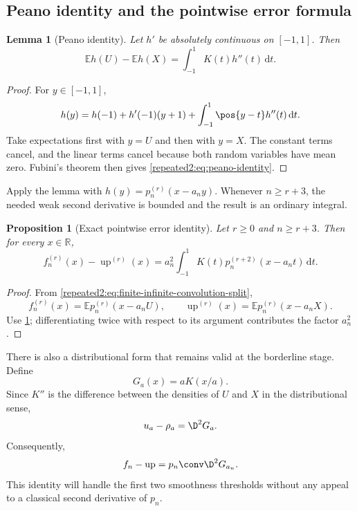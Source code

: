 \documentclass[11pt,oneside]{article}
\newtheorem{proposition}[proposition]{Proposition}
\newtheorem{lemma}[lemma]{Lemma}
\theoremstyle{definition}
\theoremstyle{remark}
\newcommand{\R}{\mathbb R}
\newcommand{\Up}{\operatorname{up}}
\newcommand{\dd}{\,\mathrm d}
\newcommand{\E}{\mathbb E}
\begin{document}
\subsection{Peano identity and the pointwise error formula}

\begin{lemma}[Peano identity]
\label{repeated2:lem:peano-identity}
Let $h'$ be absolutely continuous on $[-1,1]$.  Then
\begin{equation}
 \E h(U)-\E h(X)=\int_{-1}^{1}K(t)h''(t)\dd t.
 \label{repeated2:eq:peano-identity}
\end{equation}
\end{lemma}

\begin{proof}
For $y\in[-1,1]$,
\[
 h(y)=h(-1)+h'(-1)(y+1)+\int_{-1}^{1}\pos{y-t}h''(t)\dd t.
\]
Take expectations first with $y=U$ and then with $y=X$.  The constant terms cancel, and
the linear terms cancel because both random variables have mean zero.  Fubini's theorem
then gives \eqref{repeated2:eq:peano-identity}.
\end{proof}

Apply the lemma with $h(y)=p_n^{(r)}(x-a_ny)$.  Whenever $n\ge r+3$, the needed weak
second derivative is bounded and the result is an ordinary integral.

\begin{proposition}[Exact pointwise error identity]
\label{repeated2:prop:pointwise-error}
Let $r\ge0$ and $n\ge r+3$.  Then for every $x\in\R$,
\begin{equation}
 f_n^{(r)}(x)-\Up^{(r)}(x)
 =a_n^2\int_{-1}^{1}K(t)
 p_n^{(r+2)}(x-a_nt)\dd t.
 \label{repeated2:eq:exact-pointwise-error}
\end{equation}
\end{proposition}

\begin{proof}
From \eqref{repeated2:eq:finite-infinite-convolution-split},
\[
 f_n^{(r)}(x)=\E p_n^{(r)}(x-a_nU),
 \qquad
 \Up^{(r)}(x)=\E p_n^{(r)}(x-a_nX).
\]
Use \cref{repeated2:lem:peano-identity}; differentiating twice with respect to its argument contributes
the factor $a_n^2$.
\end{proof}

There is also a distributional form that remains valid at the borderline stage.  Define
\begin{equation}
 G_a(x)=aK(x/a).
 \label{repeated2:eq:Ga-definition}
\end{equation}
Since $K''$ is the difference between the densities of $U$ and $X$ in the distributional
sense,
\begin{equation}
 u_a-\rho_a=\D^2G_a.
 \label{repeated2:eq:kernel-distribution-identity}
\end{equation}
Consequently,
\begin{equation}
 f_n-\Up=p_n\conv\D^2G_{a_n}.
 \label{repeated2:eq:error-distribution-convolution}
\end{equation}
This identity will handle the first two smoothness thresholds without any appeal to a
classical second derivative of $p_n$.
\end{document}
